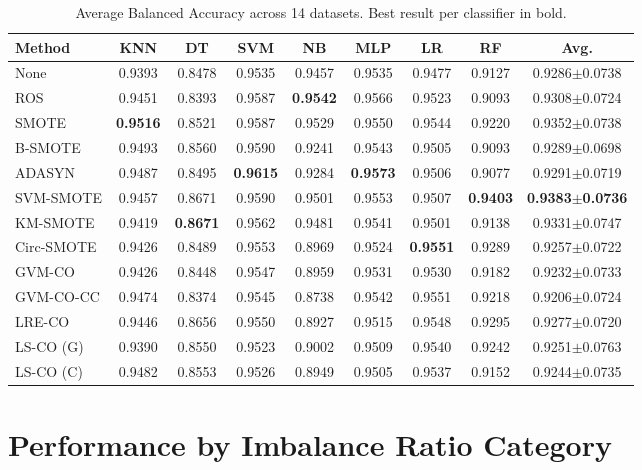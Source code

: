 \begin{table}[H]
\centering
\caption{Average Balanced Accuracy across 14 datasets. Best result per classifier in bold.}
\label{tab:results:bacc}
\small
\begin{tabular}{lcccccccc}
\toprule
\textbf{Method} & \textbf{KNN} & \textbf{DT} & \textbf{SVM} & \textbf{NB} & \textbf{MLP} & \textbf{LR} & \textbf{RF} & \textbf{Avg.} \\
\midrule
None       & 0.9393 & 0.8478 & 0.9535 & 0.9457 & 0.9535 & 0.9477 & 0.9127 & 0.9286$\pm$0.0738 \\
ROS        & 0.9451 & 0.8393 & 0.9587 & \textbf{0.9542} & 0.9566 & 0.9523 & 0.9093 & 0.9308$\pm$0.0724 \\
SMOTE      & \textbf{0.9516} & 0.8521 & 0.9587 & 0.9529 & 0.9550 & 0.9544 & 0.9220 & 0.9352$\pm$0.0738 \\
B-SMOTE    & 0.9493 & 0.8560 & 0.9590 & 0.9241 & 0.9543 & 0.9505 & 0.9093 & 0.9289$\pm$0.0698 \\
ADASYN     & 0.9487 & 0.8495 & \textbf{0.9615} & 0.9284 & \textbf{0.9573} & 0.9506 & 0.9077 & 0.9291$\pm$0.0719 \\
SVM-SMOTE  & 0.9457 & 0.8671 & 0.9590 & 0.9501 & 0.9553 & 0.9507 & \textbf{0.9403} & \textbf{0.9383$\pm$0.0736} \\
KM-SMOTE   & 0.9419 & \textbf{0.8671} & 0.9562 & 0.9481 & 0.9541 & 0.9501 & 0.9138 & 0.9331$\pm$0.0747 \\
Circ-SMOTE & 0.9426 & 0.8489 & 0.9553 & 0.8969 & 0.9524 & \textbf{0.9551} & 0.9289 & 0.9257$\pm$0.0722 \\
\midrule
GVM-CO     & 0.9426 & 0.8448 & 0.9547 & 0.8959 & 0.9531 & 0.9530 & 0.9182 & 0.9232$\pm$0.0733 \\
GVM-CO-CC  & 0.9474 & 0.8374 & 0.9545 & 0.8738 & 0.9542 & 0.9551 & 0.9218 & 0.9206$\pm$0.0724 \\
LRE-CO     & 0.9446 & 0.8656 & 0.9550 & 0.8927 & 0.9515 & 0.9548 & 0.9295 & 0.9277$\pm$0.0720 \\
LS-CO (G)  & 0.9390 & 0.8550 & 0.9523 & 0.9002 & 0.9509 & 0.9540 & 0.9242 & 0.9251$\pm$0.0763 \\
LS-CO (C)  & 0.9482 & 0.8553 & 0.9526 & 0.8949 & 0.9505 & 0.9537 & 0.9152 & 0.9244$\pm$0.0735 \\
\bottomrule
\end{tabular}
\end{table}


\section{Performance by Imbalance Ratio Category}
\label{sec:results:by_ir}

